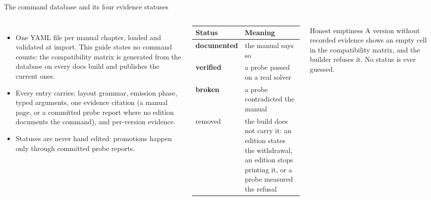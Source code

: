 \documentclass[aspectratio=169,10pt]{beamer}
\begin{document}
\begin{frame}{The command database and its four evidence statuses}
  \begin{columns}[T]
    \begin{itemize}
      \item One YAML file per manual chapter, loaded and validated at import. This guide states no command counts: the compatibility matrix is generated from the database on every docs build and publishes the current ones.
      \item Every entry carries: layout grammar, emission phase, typed arguments, one evidence citation (a manual page, or a committed probe report where no edition documents the command), and per-version evidence.
      \item Statuses are never hand edited: promotions happen only through committed probe reports.
    \end{itemize}
    \small
    \begin{tabular}{@{}lp{4.1cm}@{}}
      \toprule
      Status & Meaning \\
      \midrule
      {\color{statusgreen}\textbf{documented}} & the manual says so \\
      {\color{statusblue}\textbf{verified}} & a probe passed on a real solver \\
      {\color{statusred}\textbf{broken}} & a probe contradicted the manual \\
      {\color{statusred}removed} & the build does not carry it: an edition states the withdrawal, an edition stops printing it, or a probe measured the refusal \\
      \bottomrule
    \end{tabular}
    \vspace{2mm}
    \begin{block}{Honest emptiness}
      A version without recorded evidence shows an empty cell in the compatibility matrix, and the builder refuses it. No status is ever guessed.
    \end{block}
  \end{columns}
\end{frame}
\end{document}
